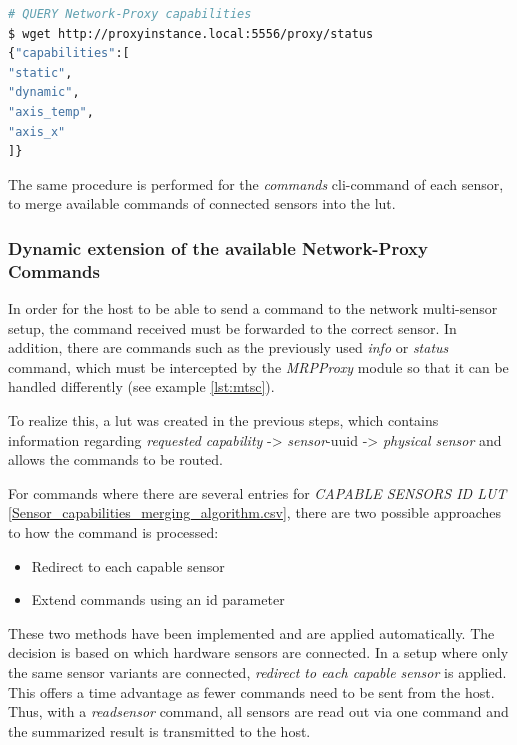 \begin{lstlisting}[language=bash, caption={MRPproxy REST enpoiint query examples}, label=lst:mtsc]
# QUERY Network-Proxy capabilities
$ wget http://proxyinstance.local:5556/proxy/status
{"capabilities":[
"static",
"dynamic",
"axis_temp",
"axis_x"
]}
\end{lstlisting}

The same procedure is performed for the \emph{commands}
\gls{cli}-command of each sensor, to merge available commands of
connected sensors into the \gls{lut}.

\hypertarget{dynamic-extension-of-the-available-network-proxy-commands}{%
\subsubsection{Dynamic extension of the available Network-Proxy
Commands}\label{dynamic-extension-of-the-available-network-proxy-commands}}

In order for the host to be able to send a command to the network
multi-sensor setup, the command received must be forwarded to the
correct sensor. In addition, there are commands such as the previously
used \emph{info} or \emph{status} command, which must be intercepted by
the \emph{MRPProxy} module so that it can be handled differently (see
example \ref{lst:mtsc}).

To realize this, a \gls{lut} was created in the previous steps, which
contains information regarding \emph{requested capability}
-\textgreater{} \emph{sensor}-\gls{uuid} -\textgreater{} \emph{physical
sensor} and allows the commands to be routed.

For commands where there are several entries for \emph{CAPABLE SENSORS
ID LUT} \ref{Sensor_capabilities_merging_algorithm.csv}, there are two
possible approaches to how the command is processed:

\begin{itemize}
\tightlist
\item
  Redirect to each capable sensor
\item
  Extend commands using an id parameter
\end{itemize}

These two methods have been implemented and are applied automatically.
The decision is based on which hardware sensors are connected. In a
setup where only the same sensor variants are connected, \emph{redirect
to each capable sensor} is applied. This offers a time advantage as
fewer commands need to be sent from the host. Thus, with a
\emph{readsensor} command, all sensors are read out via one command and
the summarized result is transmitted to the host.

